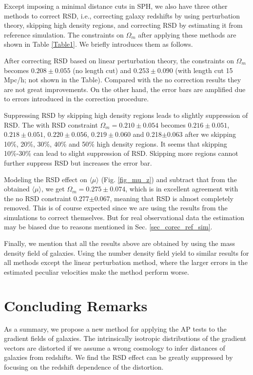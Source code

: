 \documentclass{emulateapj}
\begin{document}
Except imposing a minimal distance cuts in SPH, we also have three other methods to correct RSD, i.e.,
correcting galaxy redshifts by using perturbation theory,
skipping high density regions, 
and correcting RSD by estimating it from reference simulation.
The constraints on $\Omega_m$ after applying these methods are shown in Table \ref{Table1}.
We briefly introduces them as follows.

After correcting RSD based on linear perturbation theory, 
the constraints on $\Omega_m$ becomes $0.208\pm0.055$ (no length cut) and $0.253\pm0.090$ 
(with length cut 15 Mpc/h; not shown in the Table).
Compared with the no correction results they are not great improvements.
On the other hand, the error bars are amplified due to errors introduced in the correction procedure.

Suppressing RSD by skipping high density regions leads to slightly suppression of RSD.
The with RSD constraint $\Omega_m=0.210\pm0.054$ becomes $0.216\pm0.051$,
$0.218\pm0.051$, $0.220\pm0.056$, $0.219\pm0.060$ and 0.218$\pm$0.063 
after we skipping 10\%, 20\%, 30\%, 40\% and 50\% high density regions.
It seems that skipping 10\%-30\% can lead to slight suppression of RSD.
Skipping more regions cannot further suppress RSD but increases the error bar.

Modeling the RSD effect on $\langle\mu\rangle$ (Fig. \ref{fig_mu_z}) and subtract that from the obtained $\langle\mu\rangle$,
we get $\Omega_m=0.275\pm0.074$, which is in excellent agreement with the no RSD constraint 0.277$\pm$0.067,
meaning that RSD is almost completely removed.
This is of course expected since we are using the results from the simulations to correct themselves.
But for real observational data the estimation may be biased due to reasons mentioned in Sec. \ref{sec_corec_ref_sim}.

Finally, we mention that all the results above are obtained by using the mass density field of galaxies.
Using the number density field yield to similar results for all methods except the linear perturbation method,
where the larger errors in the estimated peculiar velocities make the method perform worse.

\section{Concluding Remarks}

As a summary, we propose a new method for applying the AP tests to the gradient fields of galaxies.
The intrinsically isotropic distributions of the gradient vectors are distorted if we assume a wrong cosmology 
to infer distances of galaxies from redshifts.
We find the RSD effect can be greatly suppressed by focusing on the redshift dependence of the distortion.
\end{document}
